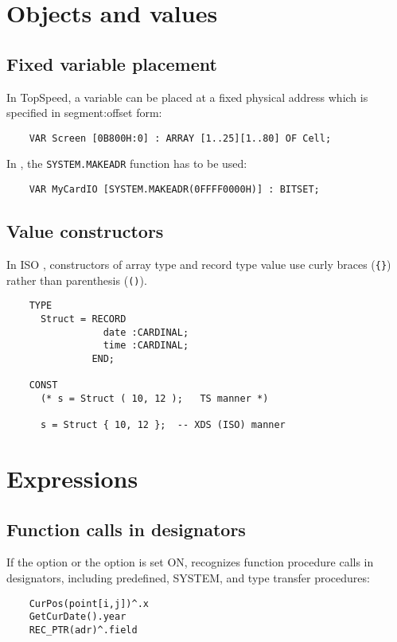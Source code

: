 \section{Objects and values}

\subsection{Fixed variable placement}

    In TopSpeed, a variable can be placed at a fixed physical address 
    which is specified in segment:offset form:

\verb'    VAR Screen [0B800H:0] : ARRAY [1..25][1..80] OF Cell;'

    In \XDS{}, the \verb'SYSTEM.MAKEADR' function has to be used:

\verb'    VAR MyCardIO [SYSTEM.MAKEADR(0FFFF0000H)] : BITSET;'

\subsection{Value constructors}

    In ISO \mt{}, constructors of array type and record type value use curly
    braces (\verb'{}') rather than parenthesis (\verb'()').

\begin{verbatim}
    TYPE
      Struct = RECORD
                 date :CARDINAL;
                 time :CARDINAL;
               END;

    CONST
      (* s = Struct ( 10, 12 );   TS manner *)

      s = Struct { 10, 12 };  -- XDS (ISO) manner
\end{verbatim}

\section{Expressions}

\subsection{Function calls in designators}

    If the option  or the option  is set ON,
    \xds{} recognizes function procedure calls in designators, including
    predefined, SYSTEM, and type transfer procedures:

\begin{verbatim}
    CurPos(point[i,j])^.x
    GetCurDate().year
    REC_PTR(adr)^.field
\end{verbatim}

